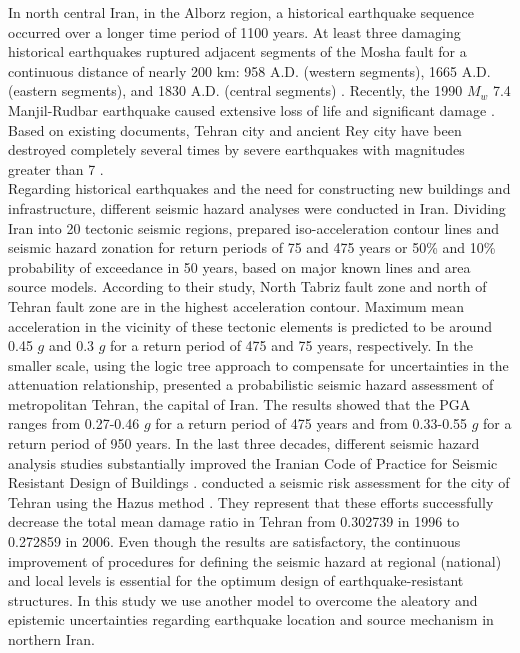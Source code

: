 \noindent
In north central Iran, in the Alborz region, a historical earthquake sequence occurred over a longer time period of 1100 years. At least three damaging historical earthquakes ruptured adjacent segments of the Mosha fault for a continuous distance of nearly 200 km: 958 A.D. (western segments), 1665 A.D. (eastern segments), and 1830 A.D. (central segments) \cite{Berberian1999}. Recently, the 1990 $M_w$ 7.4 Manjil-Rudbar earthquake caused extensive loss of life and significant damage \citep{USGS_manjil}. Based on existing documents, Tehran city and ancient Rey city have been destroyed completely several times by severe earthquakes with magnitudes greater than 7 \citep{Ambraseys2005}. \\
\noindent
Regarding historical earthquakes and the need for constructing new buildings and infrastructure, different seismic hazard analyses were conducted in Iran. Dividing Iran into 20 tectonic seismic regions, \citet{Tavakoli1999} prepared iso-acceleration contour lines and seismic hazard zonation for return periods of 75 and 475 years or 50\% and 10\% probability of exceedance in 50 years, based on major known lines and area source models. According to their study, North Tabriz fault zone and north of Tehran fault zone are in the highest acceleration contour. Maximum mean acceleration in the vicinity of these tectonic elements is predicted to be around 0.45 $g$ and 0.3 $g$ for a return period of 475 and 75 years, respectively. In the smaller scale, using the logic tree approach to compensate for uncertainties in the attenuation relationship, \citet{Ghodrati2003} presented a probabilistic seismic hazard assessment of metropolitan Tehran, the capital of Iran. The results showed that the PGA ranges from 0.27-0.46 $g$ for a return period of 475 years and from 0.33-0.55 $g$ for a return period of 950 years. In the last three decades, different seismic hazard analysis studies substantially improved the Iranian Code of Practice for Seismic Resistant Design of Buildings \citep{BHRC2014}. \citet{Ghodrati2013} conducted a seismic risk assessment for the city of Tehran using the Hazus method \citep{FEMA2003}. They represent that these efforts successfully decrease the total mean damage ratio in Tehran from 0.302739 in 1996 to 0.272859 in 2006.  Even though the results are satisfactory, the continuous improvement of procedures for defining the seismic hazard at regional (national) and local levels is essential for the optimum design of earthquake-resistant structures. In this study we use another model to overcome the aleatory and epistemic uncertainties regarding earthquake location and source mechanism in northern Iran.\\

